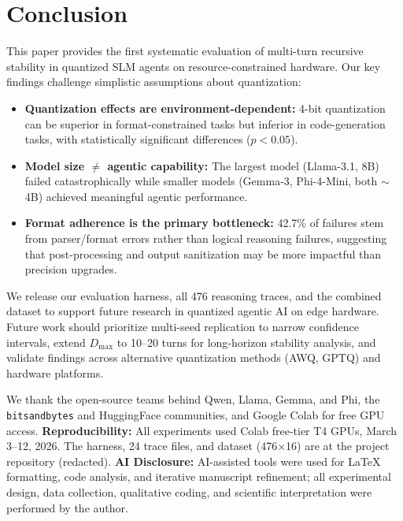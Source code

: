\documentclass{article}
\begin{document}
\section{Conclusion}

This paper provides the first systematic evaluation of multi-turn recursive stability in quantized SLM agents on resource-constrained hardware. Our key findings challenge simplistic assumptions about quantization:

\begin{itemize}[nosep]
  \item \textbf{Quantization effects are environment-dependent:} 4-bit quantization can be superior in format-constrained tasks but inferior in code-generation tasks, with statistically significant differences ($p < 0.05$).
  \item \textbf{Model size $\neq$ agentic capability:} The largest model (Llama-3.1, 8B) failed catastrophically while smaller models (Gemma-3, Phi-4-Mini, both $\sim$4B) achieved meaningful agentic performance.
  \item \textbf{Format adherence is the primary bottleneck:} 42.7\% of failures stem from parser/format errors rather than logical reasoning failures, suggesting that post-processing and output sanitization may be more impactful than precision upgrades.
\end{itemize}

We release our evaluation harness, all 476 reasoning traces, and the combined dataset to support future research in quantized agentic AI on edge hardware. Future work should prioritize multi-seed replication to narrow confidence intervals, extend $D_{\max}$ to 10--20 turns for long-horizon stability analysis, and validate findings across alternative quantization methods (AWQ, GPTQ) and hardware platforms.

\begin{ack}
We thank the open-source teams behind Qwen, Llama, Gemma, and Phi, the \texttt{bitsandbytes} and HuggingFace communities, and Google Colab for free GPU access. \textbf{Reproducibility:} All experiments used Colab free-tier T4 GPUs, March 3--12, 2026. The harness, 24 trace files, and dataset (476$\times$16) are at the project repository (redacted). \textbf{AI Disclosure:} AI-assisted tools were used for LaTeX formatting, code analysis, and iterative manuscript refinement; all experimental design, data collection, qualitative coding, and scientific interpretation were performed by the author.
\end{ack}



\end{document}
